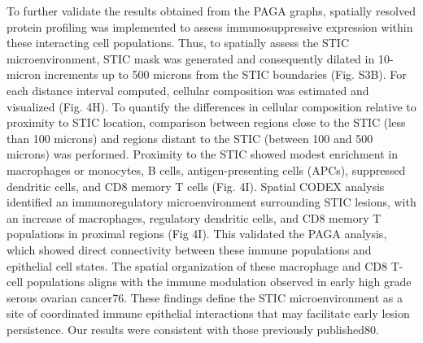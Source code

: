 \begin{refsection}
    To further validate the results obtained from the PAGA graphs, spatially resolved protein profiling was implemented to assess immunosuppressive expression within these interacting cell populations. Thus, to spatially assess the STIC microenvironment, STIC mask was generated and consequently dilated in 10-micron increments up to 500 microns from the STIC boundaries (Fig. S3B). For each distance interval computed, cellular composition was estimated and visualized (Fig. 4H). To quantify the differences in cellular composition relative to proximity to STIC location, comparison between regions close to the STIC (less than 100 microns) and regions distant to the STIC (between 100 and 500 microns) was performed. Proximity to the STIC showed modest enrichment in macrophages or monocytes, B cells, antigen-presenting cells (APCs), suppressed dendritic cells, and CD8 memory T cells (Fig. 4I).
    Spatial CODEX analysis identified an immunoregulatory microenvironment surrounding STIC lesions, with an increase of macrophages, regulatory dendritic cells, and CD8 memory T populations in proximal regions (Fig 4I). This validated the PAGA analysis, which showed direct connectivity between these immune populations and epithelial cell states. The spatial organization of these macrophage and CD8 T-cell populations aligns with the immune modulation observed in early high grade serous ovarian cancer76. These findings define the STIC microenvironment as a site of coordinated immune epithelial interactions that may facilitate early lesion persistence. Our results were consistent with those previously published80.
    

\end{refsection}
